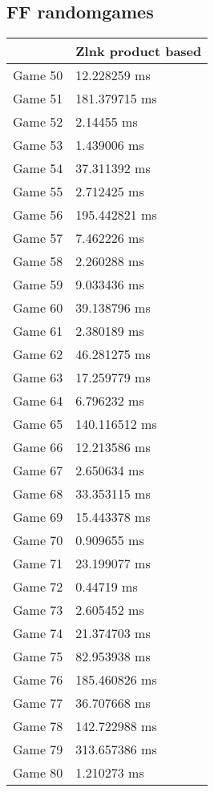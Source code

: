 \subsection{FF randomgames}
\begin{tabular}{|l|l|}
	\hline
	& Zlnk product based \\ \hline
	Game 50 & 12.228259 ms \\ \hline
	Game 51 & 181.379715 ms \\ \hline
	Game 52 & 2.14455 ms \\ \hline
	Game 53 & 1.439006 ms \\ \hline
	Game 54 & 37.311392 ms \\ \hline
	Game 55 & 2.712425 ms \\ \hline
	Game 56 & 195.442821 ms \\ \hline
	Game 57 & 7.462226 ms \\ \hline
	Game 58 & 2.260288 ms \\ \hline
	Game 59 & 9.033436 ms \\ \hline
	Game 60 & 39.138796 ms \\ \hline
	Game 61 & 2.380189 ms \\ \hline
	Game 62 & 46.281275 ms \\ \hline
	Game 63 & 17.259779 ms \\ \hline
	Game 64 & 6.796232 ms \\ \hline
	Game 65 & 140.116512 ms \\ \hline
	Game 66 & 12.213586 ms \\ \hline
	Game 67 & 2.650634 ms \\ \hline
	Game 68 & 33.353115 ms \\ \hline
	Game 69 & 15.443378 ms \\ \hline
	Game 70 & 0.909655 ms \\ \hline
	Game 71 & 23.199077 ms \\ \hline
	Game 72 & 0.44719 ms \\ \hline
	Game 73 & 2.605452 ms \\ \hline
	Game 74 & 21.374703 ms \\ \hline
	Game 75 & 82.953938 ms \\ \hline
	Game 76 & 185.460826 ms \\ \hline
	Game 77 & 36.707668 ms \\ \hline
	Game 78 & 142.722988 ms \\ \hline
	Game 79 & 313.657386 ms \\ \hline
	Game 80 & 1.210273 ms \\ \hline

\end{tabular}
